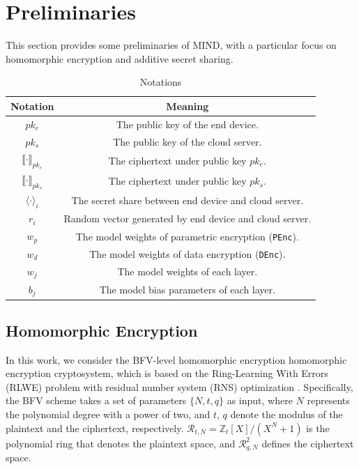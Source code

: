 \documentclass[conference]{IEEEtran}
\newcommand{\DEnc}{\texttt{DEnc}}
\newcommand{\PEnc}{\texttt{PEnc}}
\begin{document}
\section{Preliminaries}
This section provides some preliminaries of MIND, with a particular focus on homomorphic encryption and additive secret sharing.
\begin{table}[h]
\centering
\caption{Notations}
\label{table:notations}
\begin{tabular}{cc}
\toprule
\textbf{Notation} & \textbf{Meaning} \\ \midrule
$pk_e$                                   & The public key of the end device. \\
$pk_s$                                   & The public key of the cloud server. \\
$\llbracket \cdot \rrbracket_{pk_e}$     & The ciphertext under public key $pk_e$. \\
$\llbracket \cdot \rrbracket_{pk_s}$     & The ciphertext under public key $pk_s$. \\
$\langle \cdot \rangle_i$                & The secret share between end device and cloud server. \\
$r_i$                                    & Random vector generated by end device and cloud server. \\
$w_p$                                    & The model weights of parametric encryption (\PEnc).\\
$w_d$                                    & The model weights of data encryption (\DEnc).\\
$w_j$                                      & The model weights of each layer. \\
$b_j$                                      & The model bias parameters of each layer. \\

\bottomrule
\end{tabular}
\end{table}

\subsection{Homomorphic Encryption}\label{HE}
In this work, we consider the BFV-level homomorphic encryption homomorphic encryption cryptosystem, which is based on the Ring-Learning With Errors (RLWE) problem with residual number system (RNS) optimization \cite{bajard2016full}. Specifically, the BFV scheme takes a set of parameters $\{N, t, q\}$ as input, where $N$ represents the polynomial degree with a power of two, and $t$, $q$ denote the modulus of the plaintext and the ciphertext, respectively. $\mathcal{R}_{t,N} = \mathbb{Z}_t [X]/(X^N + 1)$ is the polynomial ring that denotes the plaintext space, and $\mathcal{R}_{q, N}^2$ defines the ciphertext space.
\end{document}
